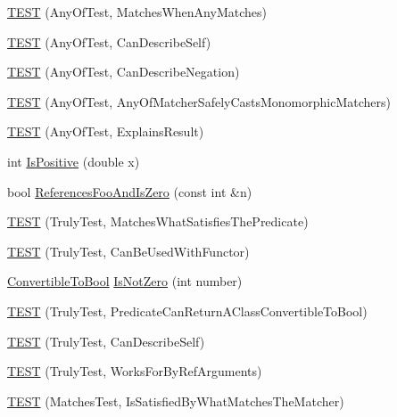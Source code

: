 \begin{DoxyCompactItemize}
\item 
\hyperlink{namespacetesting_1_1gmock__matchers__test_a4949d40a1ac77182274189c21848af00}{T\+E\+ST} (Any\+Of\+Test, Matches\+When\+Any\+Matches)
\item 
\hyperlink{namespacetesting_1_1gmock__matchers__test_a00bd490bf974b3f3485a1b0fde9fa490}{T\+E\+ST} (Any\+Of\+Test, Can\+Describe\+Self)
\item 
\hyperlink{namespacetesting_1_1gmock__matchers__test_acc5e849e0765f00a48581e9480f3c8e2}{T\+E\+ST} (Any\+Of\+Test, Can\+Describe\+Negation)
\item 
\hyperlink{namespacetesting_1_1gmock__matchers__test_a8fb1598253450afeb0440682cd23999e}{T\+E\+ST} (Any\+Of\+Test, Any\+Of\+Matcher\+Safely\+Casts\+Monomorphic\+Matchers)
\item 
\hyperlink{namespacetesting_1_1gmock__matchers__test_ad4c09014fce6029575e2c337cde85bdf}{T\+E\+ST} (Any\+Of\+Test, Explains\+Result)
\item 
int \hyperlink{namespacetesting_1_1gmock__matchers__test_a70e728cf67d0224c3ebb9eb8959cc39d}{Is\+Positive} (double x)
\item 
bool \hyperlink{namespacetesting_1_1gmock__matchers__test_abdce9daf2e3d3721d68f76680129f03b}{References\+Foo\+And\+Is\+Zero} (const int \&n)
\item 
\hyperlink{namespacetesting_1_1gmock__matchers__test_ab7761562a8ffea67a485f3f649f6430a}{T\+E\+ST} (Truly\+Test, Matches\+What\+Satisfies\+The\+Predicate)
\item 
\hyperlink{namespacetesting_1_1gmock__matchers__test_ab3e259f3ae45e199474d7c6d554852f0}{T\+E\+ST} (Truly\+Test, Can\+Be\+Used\+With\+Functor)
\item 
\hyperlink{classtesting_1_1gmock__matchers__test_1_1_convertible_to_bool}{Convertible\+To\+Bool} \hyperlink{namespacetesting_1_1gmock__matchers__test_a248045bc57c8bad87b7d185b5c292f60}{Is\+Not\+Zero} (int number)
\item 
\hyperlink{namespacetesting_1_1gmock__matchers__test_a24529fd7834d272009af74106422fe54}{T\+E\+ST} (Truly\+Test, Predicate\+Can\+Return\+A\+Class\+Convertible\+To\+Bool)
\item 
\hyperlink{namespacetesting_1_1gmock__matchers__test_af474a9719e614d521c71bdf7c39f6a7a}{T\+E\+ST} (Truly\+Test, Can\+Describe\+Self)
\item 
\hyperlink{namespacetesting_1_1gmock__matchers__test_ae702d436c52bd37fe3e8d405d7e6a691}{T\+E\+ST} (Truly\+Test, Works\+For\+By\+Ref\+Arguments)
\item 
\hyperlink{namespacetesting_1_1gmock__matchers__test_a6617484cbb644af9882fc5d853112aae}{T\+E\+ST} (Matches\+Test, Is\+Satisfied\+By\+What\+Matches\+The\+Matcher)

\end{DoxyCompactItemize}
